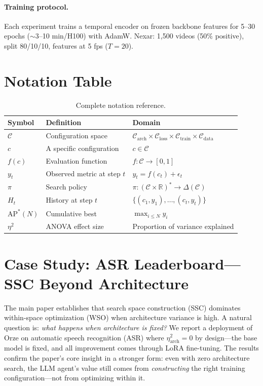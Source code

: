 \documentclass{article}
\newcommand{\Cspace}{\mathcal{C}}
\newcommand{\R}{\mathbb{R}}
\newcommand{\APstar}{\mathrm{AP}^*}
\begin{document}
\paragraph{Training protocol.}
Each experiment trains a temporal encoder on frozen backbone features for 5--30 epochs ($\sim$3--10 min/H100) with AdamW. Nexar: 1{,}500 videos (50\% positive), split 80/10/10, features at 5 fps ($T=20$).


\section{Notation Table}
\label{app:notation}

\begin{table}[ht]
\centering
\caption{Complete notation reference.}
\small
\begin{tabular}{@{}lll@{}}
\toprule
Symbol & Definition & Domain \\
\midrule
$\Cspace$ & Configuration space & $\Cspace_{\mathrm{arch}} \times \Cspace_{\mathrm{loss}} \times \Cspace_{\mathrm{train}} \times \Cspace_{\mathrm{data}}$ \\
$c$ & A specific configuration & $c \in \Cspace$ \\
$f(c)$ & Evaluation function & $f: \Cspace \to [0, 1]$ \\
$y_t$ & Observed metric at step $t$ & $y_t = f(c_t) + \epsilon_t$ \\
$\pi$ & Search policy & $\pi: (\Cspace \times \R)^* \to \Delta(\Cspace)$ \\
$H_t$ & History at step $t$ & $\{(c_1, y_1), \ldots, (c_t, y_t)\}$ \\
$\APstar(N)$ & Cumulative best & $\max_{i \leq N} y_i$ \\
$\eta^2$ & ANOVA effect size & Proportion of variance explained \\
\bottomrule
\end{tabular}
\label{tab:notation}
\end{table}


\section{Case Study: ASR Leaderboard---SSC Beyond Architecture}
\label{app:asr}

The main paper establishes that search space construction (SSC) dominates within-space optimization (WSO) when architecture variance is high.
A natural question is: \emph{what happens when architecture is fixed?}
We report a deployment of Orze on automatic speech recognition (ASR) where $\eta^2_{\mathrm{arch}} = 0$ by design---the base model is fixed, and all improvement comes through LoRA fine-tuning.
The results confirm the paper's core insight in a stronger form: even with zero architecture search, the LLM agent's value still comes from \emph{constructing} the right training configuration---not from optimizing within it.
\end{document}
